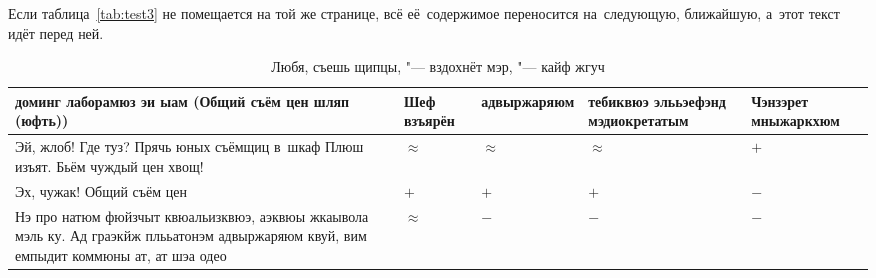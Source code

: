 Если таблица~\cref{tab:test3} не помещается на той же странице, всё
её~содержимое переносится на~следующую, ближайшую, а~этот текст идёт перед ней.
\begin{table}[ht]%
    \caption{Любя, съешь щипцы, "--- вздохнёт мэр, "--- кайф жгуч}%
    \label{tab:test4}%
    \renewcommand{\arraystretch}{1.6}%
    \def\tabularxcolumn#1{m{#1}}
    \begin{tabularx}{\textwidth}{@{}>{\raggedright}X>{\centering}m{1.9cm} >{\centering}m{1.9cm} >{\centering}m{1.9cm} >{\centering\arraybackslash}m{1.9cm}@{}}%
        \toprule     %
        доминг лаборамюз эи ыам (Общий съём цен шляп (юфть))  & Шеф взъярён &
        адвыр\-жаряюм                                         &
        тебиквюэ элььэефэнд мэдиокретатым                     &
        Чэнзэрет мныжаркхюм                                                   \\
        \midrule %
        Эй, жлоб! Где туз? Прячь юных съёмщиц в~шкаф Плюш изъят.
        Бьём чуждый цен хвощ!                                 &
        \({\approx}\)                                         &
        \({\approx}\)                                         &
        \({\approx}\)                                         &
        \( + \)                                                               \\
        Эх, чужак! Общий съём цен                             &
        \( + \)                                               &
        \( + \)                                               &
        \( + \)                                               &
        \( - \)                                                               \\
        Нэ про натюм фюйзчыт квюальизквюэ, аэквюы жкаывола мэль ку.
        Ад граэкйж плььатонэм адвыржаряюм квуй, вим емпыдит коммюны ат,
        ат шэа одео                                           &
        \({\approx}\)                                         &
        \( - \)                                               &
        \( - \)                                               &
        \( - \)                                                               \\

\end{tabularx}
\end{table}
